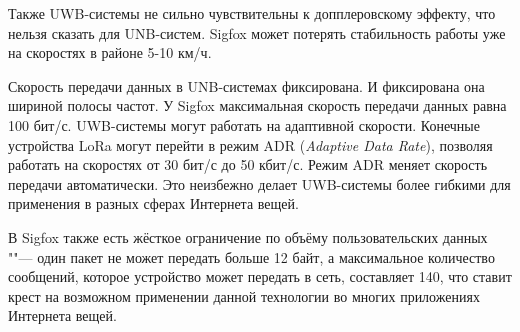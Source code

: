 Также UWB-системы не сильно чувствительны к допплеровскому эффекту, что нельзя 
сказать для UNB-систем. 
Sigfox может потерять стабильность работы уже на скоростях в районе 5-10 км/ч.

Скорость передачи данных в UNB-системах фиксирована. И фиксирована она шириной 
полосы частот.
У Sigfox максимальная скорость передачи данных равна 100 бит/с.
UWB-системы могут работать на адаптивной скорости. 
Конечные устройства LoRa могут перейти в режим ADR (\textit{Adaptive Data 
Rate}), позволяя работать на скоростях от 30 бит/с до 50 кбит/с.
Режим ADR меняет скорость передачи автоматически.
Это неизбежно делает UWB-системы более гибкими для применения в разных сферах 
Интернета вещей.

В Sigfox также есть жёсткое ограничение по объёму пользовательских данных ""--- 
один пакет не может передать больше 12 байт, а максимальное количество 
сообщений, которое устройство может передать в сеть, составляет 140, что ставит 
крест на возможном применении данной технологии во многих приложениях Интернета 
вещей.








